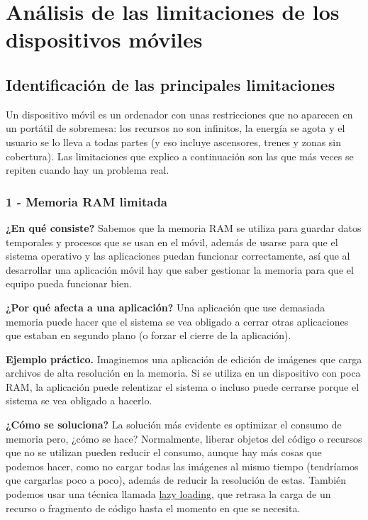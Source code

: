 \documentclass[11pt,a4paper]{article}
\newcommand{\campo}[1]{\textbf{\color{navy}#1}}
\begin{document}
	\section{Análisis de las limitaciones de los dispositivos móviles}
	
	\subsection{Identificación de las principales limitaciones}
	
	Un dispositivo móvil es un ordenador con unas restricciones que no aparecen en un portátil de sobremesa: los recursos no son infinitos, la energía se agota y el usuario se lo lleva a todas partes (y eso incluye ascensores, trenes y zonas sin cobertura). Las limitaciones que explico a continuación son las que más veces se repiten cuando hay un problema real.
	
	\subsubsection*{1 - Memoria RAM limitada}
	
	\campo{¿En qué consiste?}
	Sabemos que la memoria RAM se utiliza para guardar datos temporales y procesos que se usan en el móvil, además de usarse para que el sistema operativo y las aplicaciones puedan funcionar correctamente, así que al desarrollar una aplicación móvil hay que saber gestionar la memoria para que el equipo pueda funcionar bien.
	
	\campo{¿Por qué afecta a una aplicación?}
	Una aplicación que use demasiada memoria puede hacer que el sistema se vea obligado a cerrar otras aplicaciones que estaban en segundo plano (o forzar el cierre de la aplicación).
	
	\campo{Ejemplo práctico.}
	Imaginemos una aplicación de edición de imágenes que carga archivos de alta resolución en la memoria. Si se utiliza en un dispositivo con poca RAM, la aplicación puede relentizar el sistema o incluso puede cerrarse porque el sistema se vea obligado a hacerlo.
	
	\campo{¿Cómo se soluciona?}
	La solución más evidente es optimizar el consumo de memoria pero, ¿cómo se hace? Normalmente, liberar objetos del código o recursos que no se utilizan pueden reducir el consumo, aunque hay más cosas que podemos hacer, como no cargar todas las imágenes al mismo tiempo (tendríamos que cargarlas poco a poco), además de reducir la resolución de estas. También podemos usar una técnica llamada \href{https://es.wikipedia.org/wiki/Lazy_loading}{lazy loading}, que retrasa la carga de un recurso o fragmento de código hasta el momento en que se necesita.
	
\end{document}
